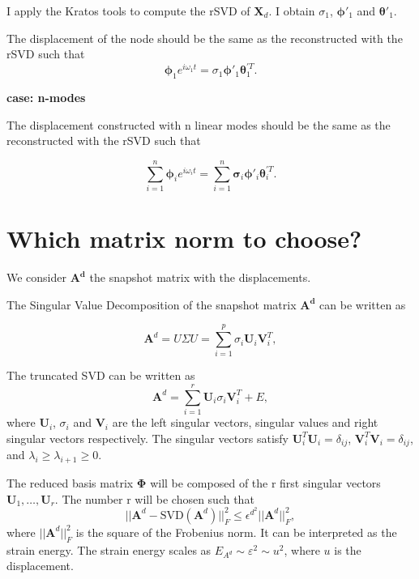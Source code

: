 \documentclass{article}
\begin{document}
I apply the Kratos tools to compute the rSVD of $\bm{X}_d$. I obtain $\sigma_1$, $\bm{\phi}'_1$ and $\bm{\theta}'_1$.\newline

The displacement of the node should be the same as the reconstructed with the rSVD such that
\begin{equation}
  \bm{\phi}_1 e^{i \omega_1 t} = \sigma_1 \bm{\phi}'_1 \bm{\theta}^{'T}_1. 
\end{equation}

\noindent \textbf{case: n-modes}

The displacement constructed with n linear modes should be the same as the reconstructed with the rSVD such that 

\begin{equation}
  \sum_{i=1}^n \bm{\phi}_i e^{i \omega_i t} = \sum_{i=1}^n \bm{\sigma}_i \bm{\phi}'_i \bm{\theta}^{'T}_i. 
\end{equation}

\section{Which matrix norm to choose?}
We consider $\bm{A^d}$ the snapshot matrix with the displacements. \newline

The Singular Value Decomposition of the snapshot matrix $\bm{A^d}$ can be written as

\begin{equation}
  \bm{A}^d = U \Sigma U =\sum_{i=1}^p \sigma_i \bm{U}_i \bm{V}_i^T,  
\end{equation}

The truncated SVD can be written as
\begin{equation}
  \bm{A}^d = \sum_{i=1}^r \bm{U}_i \sigma_i \bm{V}_i^T + E,
\end{equation}
where $\bm{U}_i$, $\sigma_i$ and $\bm{V}_i$ are the left singular vectors, singular values and right singular vectors respectively. The singular vectors satisfy $\bm{U}_i^T\bm{U}_i=\delta_{ij}$, $\bm{V}_i^T\bm{V}_i=\delta_{ij}$, and $\lambda_i \geq \lambda_{i+1} \geq 0$. \newline

The reduced basis matrix $\bm{\Phi}$ will be composed of the r first singular vectors $\bm{U}_1, \dots, \bm{U}_r$. The number r will be chosen such that 
\begin{equation}
  ||\bm{A}^d - \text{SVD}(\bm{A}^d)||_F^2 \leq \epsilon^{d^2} ||\bm{A}^d||_F^2,
  \label{eq:norm_matrix}
\end{equation}
where $||\bm{A}^d||_F^2$ is the square of the Frobenius norm. It can be interpreted as the strain energy. The strain energy scales as $E_{A^d} \sim \varepsilon^2 \sim u^2$, where $u$ is the displacement.\newline
\end{document}
